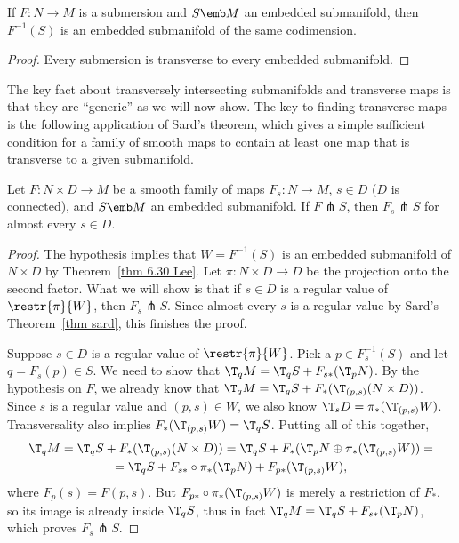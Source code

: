 \begin{cor}
    If $F:N\to M$ is a submersion and $S\emb M$ an embedded submanifold, then $F^{-1}(S)$ is an embedded submanifold of the same codimension.
\end{cor}
\begin{proof}
    Every submersion is transverse to every embedded submanifold.
\end{proof}

The key fact about transversely intersecting submanifolds and transverse maps is that they are ``generic'' as we will now show. The key to finding transverse maps is the
following application of Sard's theorem, which gives a simple sufficient condition for
a family of smooth maps to contain at least one map that is transverse to a given submanifold.

\begin{thm}\label{thm 6.35 Lee}
    Let $F:N\times D\to M$ be a smooth family of maps $F_s:N\to M$, $s\in D$ ($D$ is connected), and $S\emb M$ an embedded submanifold. If $F \pitchfork S$, then $F_s\pitchfork S$ for almost every $s\in D$.
\end{thm}
\begin{proof}
    The hypothesis implies that $W=F^{-1}(S)$ is an embedded submanifold of $N\times D$ by Theorem~\ref{thm 6.30 Lee}. Let $\pi:N\times D\to D$ be the projection onto the second factor. What we will show is that if $s\in D$ is a regular value of $\restr{\pi}{W}$, then $F_s\pitchfork S$. Since almost every $s$ is a regular value by Sard's Theorem~\ref{thm sard}, this finishes the proof.

    Suppose $s\in D$ is a regular value of $\restr{\pi}{W}$. Pick a $p\in F_s^{-1}(S)$ and let $q=F_s(p)\in S$. We need to show that $\T_qM=\T_qS+F_{s\ast}(\T_pN)$. By the hypothesis on $F$, we already know that $\T_qM=\T_qS+F_\ast(\T_{(p,s)}(N\times D))$. Since $s$ is a regular value and $(p,s)\in W$, we also know $\T_sD=\pi_\ast(\T_{(p,s)}W)$. Transversality also implies $F_\ast(\T_{(p,s)}W)=\T_qS$. Putting all of this together,
    \begin{multline}
        \T_qM=\T_qS+F_\ast(\T_{(p,s)}(N\times D))=\T_qS+F_\ast(\T_pN\oplus \pi_\ast(\T_{(p,s)}W))=\\=\T_qS+F_{s\ast}\circ\pi_\ast(\T_pN)+F_{p\ast}(\T_{(p,s)}W),
    \end{multline}
    where $F_p(s)=F(p,s)$. But $F_{p\ast}\circ\pi_\ast(\T_{(p,s)}W)$ is merely a restriction of $F_\ast$, so its image is already inside $\T_qS$, thus in fact $\T_qM=\T_qS+F_{s\ast}(\T_pN)$, which proves $F_s\pitchfork S$.
\end{proof}



